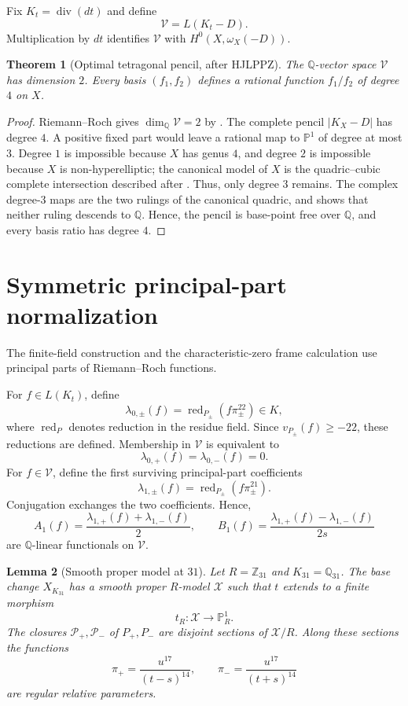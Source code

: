 \documentclass[11pt]{article}
\newtheorem{theorem}{Theorem}[section]
\newtheorem{lemma}[theorem]{Lemma}
\newcommand{\Q}{\mathbb Q}
\newcommand{\PP}{\mathbb P}
\begin{document}
Fix $K_t=\operatorname{div}(dt)$ and define
\[
\mathcal V=L(K_t-D).
\]
Multiplication by $dt$ identifies $\mathcal V$ with $H^0(X,\omega_X(-D))$.

\begin{theorem}[Optimal tetragonal pencil, after HJLPPZ]\label{thm:tetragonal-pencil}
The $\Q$-vector space $\mathcal V$ has dimension $2$.  Every basis $(f_1,f_2)$ defines a rational function $f_1/f_2$ of degree $4$ on $X$.
\end{theorem}

\begin{proof}
Riemann--Roch gives $\dim_\Q\mathcal V=2$ by \cite[Remark~3.4]{HJLPPZ2026}.  The complete pencil $|K_X-D|$ has degree $4$.  A positive fixed part would leave a rational map to $\PP^1$ of degree at most $3$.  Degree $1$ is impossible because $X$ has genus $4$, and degree $2$ is impossible because $X$ is non-hyperelliptic; the canonical model of $X$ is the quadric--cubic complete intersection described after \cite[Lemma~3.3]{HJLPPZ2026}.  Thus, only degree $3$ remains.  The complex degree-$3$ maps are the two rulings of the canonical quadric, and \cite[Remark~3.4]{HJLPPZ2026} shows that neither ruling descends to $\Q$.  Hence, the pencil is base-point free over $\Q$, and every basis ratio has degree $4$.
\end{proof}
\section{Symmetric principal-part normalization}\label{sec:principal-parts}
The finite-field construction and the characteristic-zero frame calculation use principal parts of Riemann--Roch functions.  

For $f\in L(K_t)$, define
\[
\lambda_{0,\pm}(f)=\operatorname{red}_{P_\pm}\!\left(f\pi_\pm^{22}\right)\in K,
\]
where $\operatorname{red}_{P}$ denotes reduction in the residue field.  Since $v_{P_\pm}(f)\ge-22$, these reductions are defined.  Membership in $\mathcal V$ is equivalent to
\[
\lambda_{0,+}(f)=\lambda_{0,-}(f)=0.
\]
For $f\in\mathcal V$, define the first surviving principal-part coefficients
\[
\lambda_{1,\pm}(f)=\operatorname{red}_{P_\pm}\!\left(f\pi_\pm^{21}\right).
\]
Conjugation exchanges the two coefficients.  Hence,
\[
A_1(f)=\frac{\lambda_{1,+}(f)+\lambda_{1,-}(f)}2,
\qquad
B_1(f)=\frac{\lambda_{1,+}(f)-\lambda_{1,-}(f)}{2s}
\]
are $\Q$-linear functionals on $\mathcal V$.

\begin{lemma}[Smooth proper model at $31$]\label{lem:p31-model}
Let $R=\mathbb Z_{31}$ and $K_{31}=\mathbb Q_{31}$.  The base change $X_{K_{31}}$ has a smooth proper $R$-model $\mathcal X$ such that $t$ extends to a finite morphism
\[
t_R:\mathcal X\longrightarrow\PP^1_R.
\]
The closures $\mathcal P_+,\mathcal P_-$ of $P_+,P_-$ are disjoint sections of $\mathcal X/R$.  Along these sections the functions
\[
\pi_+=\frac{u^{17}}{(t-s)^{14}},\qquad
\pi_-=\frac{u^{17}}{(t+s)^{14}}
\]
are regular relative parameters.
\end{lemma}
\end{document}
